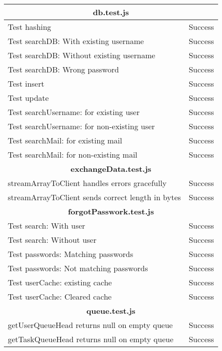 \begin{table}[H]
    \centering
    \begin{tabular}{|p{13cm}|l|}
        \hline
                \multicolumn{2}{|c|}{\textbf{db.test.js}} \\ \hline
        Test hashing & Success\\ \hline
        Test searchDB: With existing username & Success\\ \hline
        Test searchDB: Without existing username & Success\\ \hline
        Test searchDB: Wrong password & Success\\ \hline
        Test insert & Success\\ \hline
        Test update & Success\\ \hline
        Test searchUsername: for existing user & Success\\ \hline
        Test searchUsername: for non-existing user & Success\\ \hline
        Test searchMail: for existing mail & Success\\ \hline
        Test searchMail: for non-existing mail & Success\\ \hline
        \multicolumn{2}{|c|}{\textbf{exchangeData.test.js}}\\ \hline
        streamArrayToClient handles errors gracefully & Success\\ \hline
        streamArrayToClient sends correct length in bytes & Success\\ \hline
        \multicolumn{2}{|c|}{\textbf{forgotPasswork.test.js}}\\ \hline
        Test search: With user & Success\\ \hline
        Test search: Without user & Success\\ \hline
        Test passwords: Matching passwords & Success\\ \hline
        Test passwords: Not matching passwords & Success\\ \hline
        Test userCache: existing cache & Success\\ \hline
        Test userCache: Cleared cache & Success\\ \hline
        \multicolumn{2}{|c|}{\textbf{queue.test.js}}\\ \hline
        getUserQueueHead returns null on empty queue & Success\\ \hline
        getTaskQueueHead returns null on empty queue & Success\\ \hline

\end{tabular}
\end{table}
